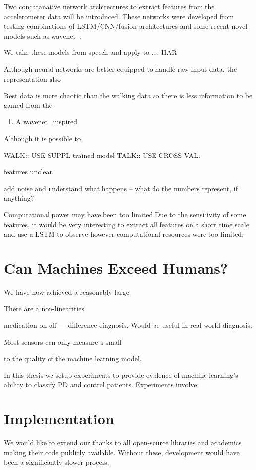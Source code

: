 \documentclass[12pt, twoside]{book}
\begin{document}
Two concatanative network architectures to extract features from the accelerometer data will be introduced. These networks were developed from testing combinations of LSTM/CNN/fusion architectures and some recent novel models such as wavenet~\cite{wavenet}. 

We take these models from speech and apply to .... HAR~\cite{deepconvlstm}

Although neural networks are better equipped to handle raw input data, the representation also 


Rest data is more chaotic than the walking data so there is less information to be gained from the 

\begin{enumerate}[noitemsep, topsep=-10pt]
	\item A wavenet~\cite{wavenet} inspired 
\end{enumerate}

Although it is possible to 

WALK:: USE SUPPL trained model
TALK:: USE CROSS VAL.

features unclear.

add noise and understand what happens -- what do the numbers represent, if anything?



Computational power may have been too limited
Due to the sensitivity of some features, it would be very interesting to extract all features on a short time scale and use a LSTM to observe
however computational resources were too limited. 

\section{Can Machines Exceed Humans?}
\label{powerml}
We have now achieved a reasonably large 


There are a non-linearities


medication on off --- difference diagnosis. Would be useful in real world diagnosis.

Most sensors can only measure a small 

to the quality of the machine learning model. 


In this thesis we setup experiments to provide evidence of machine learning's ability to classify PD and control patients. Experiments involve:

\section{Implementation}
\label{implementation}
We would like to extend our thanks to all open-source libraries and academics making their code publicly available. Without these, development would have been a significantly slower process. 
\end{document}
